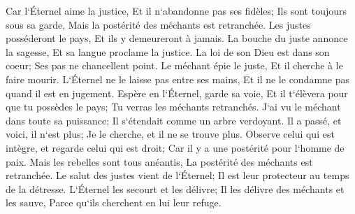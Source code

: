 \verse Car l`Éternel aime la justice, Et il n`abandonne pas ses fidèles; Ils sont toujours sous sa garde, Mais la postérité des méchants est retranchée. 
\verse Les justes posséderont le pays, Et ils y demeureront à jamais. 
\verse La bouche du juste annonce la sagesse, Et sa langue proclame la justice. 
\verse La loi de son Dieu est dans son coeur; Ses pas ne chancellent point. 
\verse Le méchant épie le juste, Et il cherche à le faire mourir. 
\verse L`Éternel ne le laisse pas entre ses mains, Et il ne le condamne pas quand il est en jugement. 
\verse Espère en l`Éternel, garde sa voie, Et il t`élèvera pour que tu possèdes le pays; Tu verras les méchants retranchés. 
\verse J`ai vu le méchant dans toute sa puissance; Il s`étendait comme un arbre verdoyant. 
\verse Il a passé, et voici, il n`est plus; Je le cherche, et il ne se trouve plus. 
\verse Observe celui qui est intègre, et regarde celui qui est droit; Car il y a une postérité pour l`homme de paix. 
\verse Mais les rebelles sont tous anéantis, La postérité des méchants est retranchée. 
\verse Le salut des justes vient de l`Éternel; Il est leur protecteur au temps de la détresse. 
\verse L`Éternel les secourt et les délivre; Il les délivre des méchants et les sauve, Parce qu`ils cherchent en lui leur refuge. 

\chapter{}

